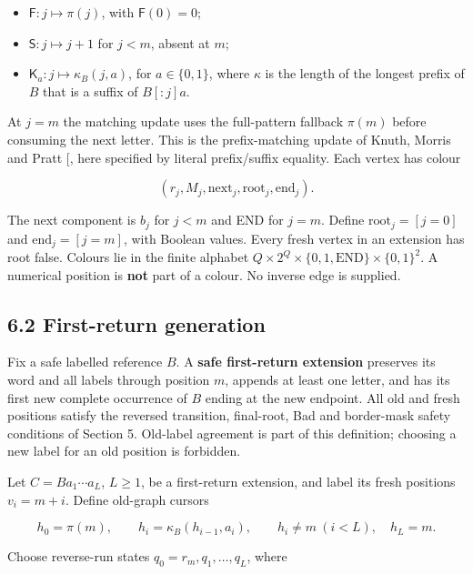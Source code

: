 \documentclass[
  11pt,
  a4paper,
]{article}
\providecommand{\tightlist}{%
  \setlength{\itemsep}{0pt}\setlength{\parskip}{0pt}}
\begin{document}
\begin{itemize}
\tightlist
\item
  \(\mathsf F:j\mapsto\pi(j)\), with \(\mathsf F(0)=0\);
\item
  \(\mathsf S:j\mapsto j+1\) for \(j<m\), absent at \(m\);
\item
  \(\mathsf K_a:j\mapsto\kappa_B(j,a)\), for \(a\in\{0,1\}\), where
  \(\kappa\) is the length of the longest prefix of \(B\) that is a
  suffix of \(B[:j]a\).
\end{itemize}

At \(j=m\) the matching update uses the full-pattern fallback \(\pi(m)\)
before consuming the next letter. This is the prefix-matching update of
Knuth, Morris and Pratt {[}\citeproc{ref-KMP77}{6}{]}, here specified by
literal prefix/suffix equality. Each vertex has colour

\[(r_j,M_j,\mathrm{next}_j,\mathrm{root}_j,\mathrm{end}_j).\]

The next component is \(b_j\) for \(j<m\) and END for \(j=m\). Define
\(\mathrm{root}_j=[j=0]\) and \(\mathrm{end}_j=[j=m]\), with Boolean
values. Every fresh vertex in an extension has root false. Colours lie
in the finite alphabet
\(Q\times2^Q\times\{0,1,\mathrm{END}\}\times\{0,1\}^2\). A numerical
position is \textbf{not} part of a colour. No inverse edge is supplied.

\subsection{6.2 First-return generation}\label{first-return-generation}

Fix a safe labelled reference \(B\). A \textbf{safe first-return
extension} preserves its word and all labels through position \(m\),
appends at least one letter, and has its first new complete occurrence
of \(B\) ending at the new endpoint. All old and fresh positions satisfy
the reversed transition, final-root, Bad and border-mask safety
conditions of Section 5. Old-label agreement is part of this definition;
choosing a new label for an old position is forbidden.

Let \(C=B a_1\cdots a_L\), \(L\ge1\), be a first-return extension, and
label its fresh positions \(v_i=m+i\). Define old-graph cursors

\[h_0=\pi(m),\qquad h_i=\kappa_B(h_{i-1},a_i),\qquad
h_i\ne m\ (i<L),\quad h_L=m.\tag{6.1}\]

Choose reverse-run states \(q_0=r_m,q_1,\ldots,q_L\), where
\end{document}
